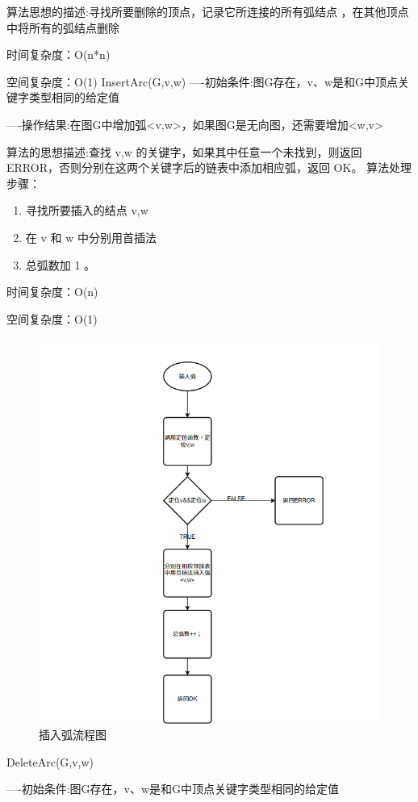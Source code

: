 \documentclass[supercite]{Experimental_Report}
\theoremstyle{definition}
\begin{document}
算法思想的描述:寻找所要删除的顶点，记录它所连接的所有弧结点 ，在其他顶点中将所有的弧结点删除


时间复杂度：O(n*n)

空间复杂度：O(1)
InsertArc(G,v,w)
----初始条件:图G存在，v、w是和G中顶点关键字类型相同的给定值

----操作结果:在图G中增加弧<v,w>，如果图G是无向图，还需要增加<w,v>

算法的思想描述:查找 v,w 的关键字，如果其中任意一个未找到，则返回 ERROR，否则分别在这两个关键字后的链表中添加相应弧，返回 OK。	
算法处理步骤：
\begin{enumerate}
	\renewcommand{\labelenumi}{\theenumi)}
	\item 寻找所要插入的结点 v,w
	\item 在 v 和 w 中分别用首插法
	\item 总弧数加 1 。
\end{enumerate}

时间复杂度：O(n)

空间复杂度：O(1)
\begin{figure}[H] %
	\begin{center}
		\includegraphics[width=0.8\linewidth]{images/2.3.5.png}
		\caption{插入弧流程图}
	\end{center}
\end{figure}
DeleteArc(G,v,w)

----初始条件:图G存在，v、w是和G中顶点关键字类型相同的给定值
\end{document}
